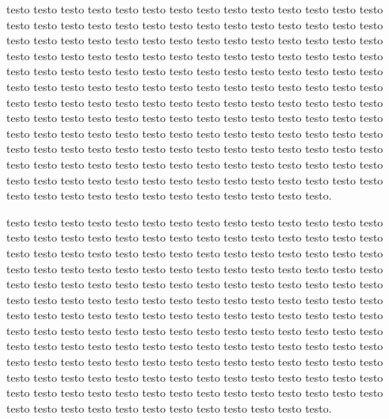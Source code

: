 \documentclass[11pt,a4paper]{book}
\begin{document}
\begin{pages}
\begin{Rightside}
\beginnumbering
\pstart testo testo testo testo testo testo testo testo testo testo testo testo testo testo testo testo testo testo testo testo testo testo testo testo testo testo testo testo testo testo testo testo testo testo testo testo testo testo testo testo testo testo testo testo testo testo testo testo testo testo testo testo testo testo testo testo testo testo testo testo testo testo testo testo testo testo testo testo testo testo testo testo testo testo testo testo testo testo testo testo testo testo testo testo testo testo testo testo testo testo testo testo testo testo testo testo testo testo testo testo testo testo testo testo testo testo testo testo testo testo testo testo testo testo testo testo testo testo testo testo testo testo testo testo testo testo testo testo testo testo testo testo testo testo testo testo testo testo testo testo testo testo testo testo testo testo testo testo testo testo testo testo testo testo testo testo testo testo testo testo testo testo testo testo testo testo testo testo testo testo testo testo testo testo testo testo testo testo testo testo.\pend

\pstart testo testo testo testo testo testo testo testo testo testo testo testo testo testo testo testo testo testo testo testo testo testo testo testo testo testo testo testo testo testo testo testo testo testo testo testo testo testo testo testo testo testo testo testo testo testo testo testo testo testo testo testo testo testo testo testo testo testo testo testo testo testo testo testo testo testo testo testo testo testo testo testo testo testo testo testo testo testo testo testo testo testo testo testo testo testo testo testo testo testo testo testo testo testo testo testo testo testo testo testo testo testo testo testo testo testo testo testo testo testo testo testo testo testo testo testo testo testo testo testo testo testo testo testo testo testo testo testo testo testo testo testo testo testo testo testo testo testo testo testo testo testo testo testo testo testo testo testo testo testo testo testo testo testo testo testo testo testo testo testo testo testo testo testo testo testo testo testo testo testo testo testo testo testo testo testo testo testo testo testo.\pend

\endnumbering
\end{Rightside}
\Pages
\end{pages}
\end{document}
